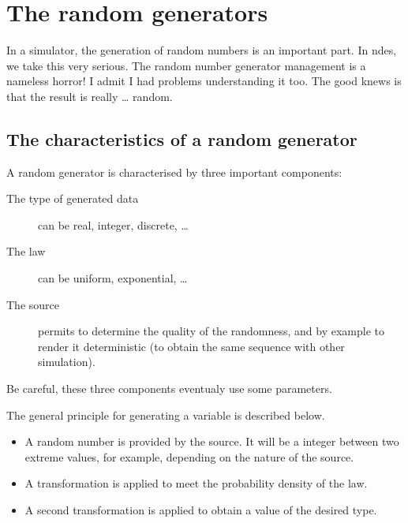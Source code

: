 %
\section{The random generators}
\label{section:random-generator}

  In a simulator, the generation of random numbers is an important part. 
In {\sc ndes}, we take this very serious. The random number generator 
management is a nameless horror! I admit I had problems understanding it too. 
The good knews is that the result is really \ldots{} random.

%
\subsection{The characteristics of a random generator}

 A random generator is characterised by three important components:

\begin{description}
   \item[The type of generated data] can be real, integer,
     discrete, \ldots
   \item[The law] can be uniform, exponential, \ldots
   \item[The source] permits to determine the quality of the randomness, and 
by example to render it deterministic (to obtain the same sequence with other 
simulation).
\end{description}

  Be careful, these three components eventualy use some parameters.
  
    The general principle for generating a variable is described below.

\begin{itemize}
   \item A random number is provided by the source. It will be a
      integer between two extreme values​​, for example, depending on
      the nature of the source.
   \item A transformation is applied to meet the probability density 
      of the law.
   \item A second transformation is applied to obtain a
      value of the desired type.
\end{itemize}

